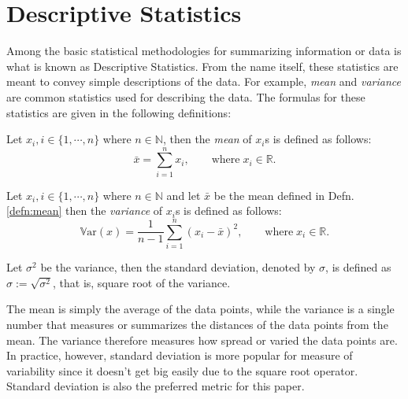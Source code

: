 \section{Descriptive Statistics}\label{sec:descriptive_stat_method}
Among the basic statistical methodologies for summarizing information or data is what is known as Descriptive Statistics. From the name itself, these statistics are meant to convey simple descriptions of the data. For example, \textit{mean} and \textit{variance} are common statistics used for describing the data. The formulas for these statistics are given in the following definitions:
\begin{defn}[Mean]\label{defn:mean}
Let $x_i, i\in\{1,\cdots,n\}$ where $n\in\mathbb{N}$, then the \textit{mean} of $x_i$s is defined as follows:
\begin{equation}
    \bar{x} = \sum_{i=1}^n x_i, \qquad\text{where}\;x_i \in\mathbb{R}.
\end{equation}
\end{defn}
\begin{defn}[Variance]
    Let $x_i, i\in\{1,\cdots,n\}$ where $n\in\mathbb{N}$ and let $\bar{x}$ be the mean defined in Defn. \ref{defn:mean} then the \textit{variance} of $x_i$s is defined as follows:
    \begin{equation}
        \mathbb{V}\text{ar}(x) = \frac{1}{n-1}\sum_{i=1}^n (x_i-\bar{x})^2, \qquad\text{where}\;x_i \in\mathbb{R}.
    \end{equation}    
\end{defn}
\begin{defn}
Let $\sigma^2$ be the variance, then the standard deviation, denoted by $\sigma$, is defined as $\sigma:=\sqrt{\sigma^2}$, that is, square root of the variance.    
\end{defn}
The mean is simply the average of the data points, while the variance is a single number that measures or summarizes the distances of the data points from the mean. The variance therefore measures how spread or varied the data points are. In practice, however, standard deviation is more popular for measure of variability since it doesn't get big easily due to the square root operator. Standard deviation is also the preferred metric for this paper.
